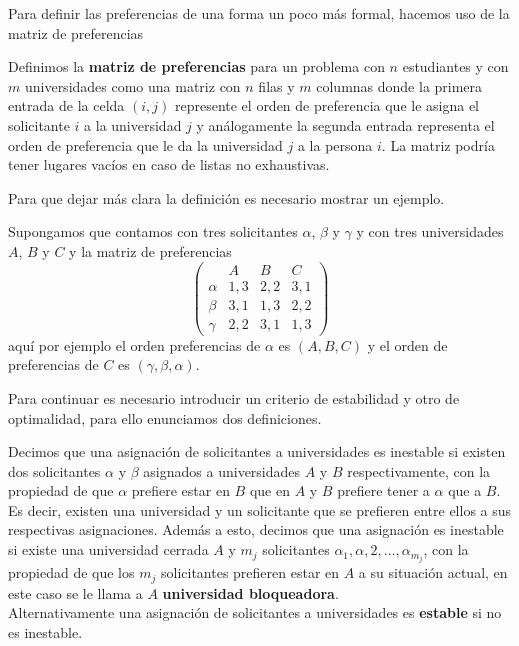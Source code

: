 Para definir las preferencias de una forma un poco más formal, hacemos uso de la matriz de preferencias

\begin{dfn}
\label{matpref}
Definimos la \textbf{matriz de preferencias} para un problema con $n$ estudiantes y con $m$ universidades como una matriz con $n$ filas y $m$ columnas donde la primera entrada de la celda $(i,j)$ represente el orden de preferencia que le asigna el solicitante $i$ a la universidad $j$ y análogamente la segunda entrada representa el orden de preferencia que le da la universidad $j$ a la persona $i$. La matriz podría tener lugares vacíos en caso de listas no exhaustivas. 
\end{dfn}

Para que dejar más clara la definición es necesario mostrar un ejemplo. 

\begin{eje}
\label{ejemplo matrimonio 1}
Supongamos que contamos con tres solicitantes $\alpha$, $\beta$ y $\gamma$ y con tres universidades $A$, $B$ y $C$ y la matriz de preferencias
$$\begin{pmatrix}
& A & B & C \\
\alpha & 1,3 & 2,2 & 3,1 \\
\beta & 3,1 & 1,3 & 2,2 \\
\gamma & 2,2 & 3,1 & 1,3 
\end{pmatrix}$$
aquí por ejemplo el orden preferencias de $\alpha$ es $(A,B,C)$ y el orden de preferencias de $C$ es $(\gamma, \beta, \alpha)$.
\fin
\end{eje}


Para continuar es necesario introducir un criterio de estabilidad y otro de optimalidad, para ello enunciamos dos definiciones. 

\begin{dfn}{\cite{GaleShapley}}
\label{Estable}
Decimos que una asignación de solicitantes a universidades es inestable si existen dos solicitantes $\alpha$ y $\beta$ asignados a universidades $A$ y $B$ respectivamente, con la propiedad de que $\alpha$ prefiere estar en $B$ que en $A$ y $B$ prefiere tener a $\alpha$ que a $B$. Es decir, existen una universidad y un solicitante que se prefieren entre ellos a sus respectivas asignaciones. 
Además a esto, decimos que una asignación es inestable si existe una universidad cerrada $A$ y $m_j$ solicitantes $\alpha_1,\alpha,2,\dots,\alpha_{m_j}$, con la propiedad de que los $m_j$ solicitantes prefieren estar en $A$ a su situación actual, en este caso se le llama a $A$ \textbf{universidad bloqueadora}.\\
Alternativamente una asignación de solicitantes a universidades es \textbf{estable} si no es inestable.
\end{dfn}

